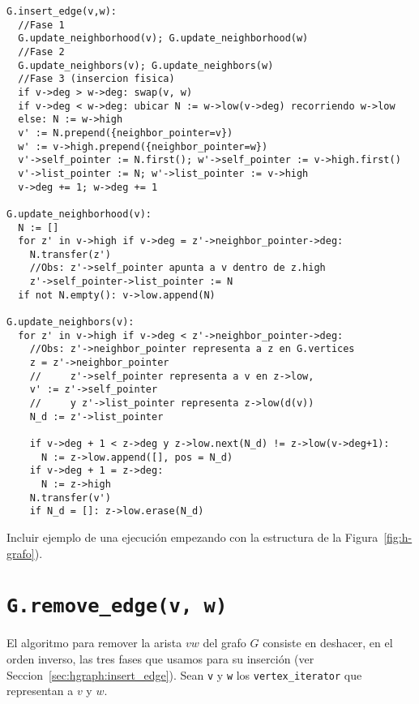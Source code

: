 \documentclass[%
    a4paper,%
    fontsize=12pt,%
    DIV=12,
    twoside,%
    openright,%
    titlepage=true,%
    headsepline,%
    toc=bibliography,%
    parskip=half,%
    cleardoublepage=empty,%
    headings=big,%
]{scrbook}
\makeatletter
\newcommand{\Code}[1]{\lstinline[basicstyle={\ttfamily}]@#1@}
\makeatother
\begin{document}
\begin{lstlisting}[caption={Implementación de \Code{insert_edge}.},float=ht,label={lst:pseudo:G.insert_edge}]
G.insert_edge(v,w):
  //Fase 1
  G.update_neighborhood(v); G.update_neighborhood(w)
  //Fase 2
  G.update_neighbors(v); G.update_neighbors(w)
  //Fase 3 (insercion fisica)
  if v->deg > w->deg: swap(v, w)
  if v->deg < w->deg: ubicar N := w->low(v->deg) recorriendo w->low
  else: N := w->high
  v' := N.prepend({neighbor_pointer=v})
  w' := v->high.prepend({neighbor_pointer=w})
  v'->self_pointer := N.first(); w'->self_pointer := v->high.first()
  v'->list_pointer := N; w'->list_pointer := v->high
  v->deg += 1; w->deg += 1

G.update_neighborhood(v):
  N := []
  for z' in v->high if v->deg = z'->neighbor_pointer->deg:
    N.transfer(z')
    //Obs: z'->self_pointer apunta a v dentro de z.high
    z'->self_pointer->list_pointer := N
  if not N.empty(): v->low.append(N)

G.update_neighbors(v):
  for z' in v->high if v->deg < z'->neighbor_pointer->deg:
    //Obs: z'->neighbor_pointer representa a z en G.vertices
    z = z'->neighbor_pointer
    //     z'->self_pointer representa a v en z->low,
    v' := z'->self_pointer
    //     y z'->list_pointer representa z->low(d(v))
    N_d := z'->list_pointer
     
    if v->deg + 1 < z->deg y z->low.next(N_d) != z->low(v->deg+1):
      N := z->low.append([], pos = N_d)
    if v->deg + 1 = z->deg:
      N := z->high
    N.transfer(v')
    if N_d = []: z->low.erase(N_d)
\end{lstlisting}


{\huge Incluir ejemplo de una ejecución empezando con la estructura de la Figura~\ref{fig:h-grafo})}.

\section{\texorpdfstring{\Code{G.remove_edge(v, w)}}{G.remove\_edge(v, w)}}
\label{sec:hgraph:remove_edge}

El algoritmo para remover la arista $vw$ del grafo $G$ consiste en deshacer, en el orden inverso, las tres fases que usamos para su inserción (ver Seccion~\ref{sec:hgraph:insert_edge}).  Sean \Code{v} y \Code{w} los \Code{vertex_iterator} que representan a $v$ y $w$.
\end{document}
